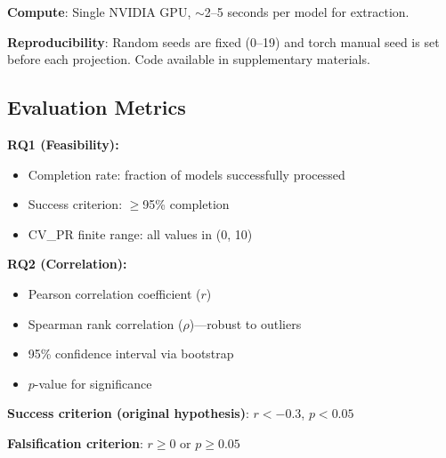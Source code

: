\textbf{Compute}: Single NVIDIA GPU, $\sim$2--5 seconds per model for extraction.

\textbf{Reproducibility}: Random seeds are fixed (0--19) and torch manual seed is set before each projection. Code available in supplementary materials.

\subsection{Evaluation Metrics}

\textbf{RQ1 (Feasibility):}
\begin{itemize}
    \item Completion rate: fraction of models successfully processed
    \item Success criterion: $\geq$95\% completion
    \item CV\_PR finite range: all values in (0, 10)
\end{itemize}

\textbf{RQ2 (Correlation):}
\begin{itemize}
    \item Pearson correlation coefficient ($r$)
    \item Spearman rank correlation ($\rho$)---robust to outliers
    \item 95\% confidence interval via bootstrap
    \item $p$-value for significance
\end{itemize}

\textbf{Success criterion (original hypothesis)}: $r < -0.3$, $p < 0.05$

\textbf{Falsification criterion}: $r \geq 0$ or $p \geq 0.05$
